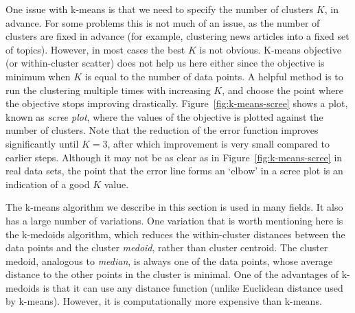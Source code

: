 One issue with k-means is that we need to specify the number of clusters $K$,
in advance.
For some problems this is not much of an issue,
as the number of clusters are fixed in advance
(for example, clustering news articles into a fixed set of topics).
However, in most cases the best $K$ is not obvious.
K-means objective (or within-cluster scatter) does not help us here either
since the objective is minimum when $K$ is equal to the number of data points.
A helpful method is to run the clustering multiple times with increasing $K$,
and choose the point where the objective stops improving drastically.
Figure~\ref{fig:k-means-scree} shows a plot,
known as \emph{scree plot},
where the values of the objective is plotted against the number of clusters.
Note that the reduction of the error function improves significantly
until $K=3$,
after which improvement is very small compared to earlier steps.
Although it may not be as clear as in Figure~\ref{fig:k-means-scree}
in real data sets,
the point that the error line forms an `elbow' in a scree plot
is an indication of a good $K$ value.

\begin{marginfigure}
  \caption{\label{fig:k-means-scree}%
    The scree plot for the data set in Figure~\protect\ref{fig:k-means-demo}.
    The graph shows squared error (Equation~\ref{eq:k-means-obj})
    after k-means algorithm has converged
    for $K$ values between \num{1} and \num{10}.
  }
\end{marginfigure}

The k-means algorithm we describe in this section is used in many fields.
It also has a large number of variations.
One variation that is worth mentioning here is the k-medoids algorithm,
which reduces the within-cluster distances between the data points
and the cluster \emph{medoid}, rather than cluster centroid.
The cluster medoid, analogous to \emph{median},
is always one of the data points,
whose average distance to the other points in the cluster is minimal. 
One of the advantages of k-medoids is
that it can use any distance function
(unlike Euclidean distance used by k-means).
However,
it is computationally more expensive than k-means.

